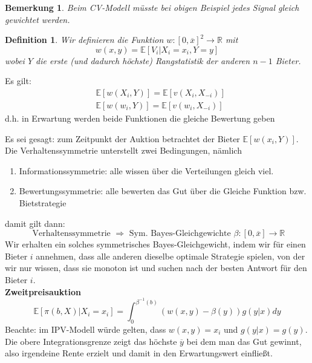 \documentclass[12pt]{extreport} %
\newcommand{\R}{\mathbb{R}}
\theoremstyle{named}
\theoremstyle{nnamed}
\theoremstyle{itshape}
\newtheorem*{definition}{Definition}
\theoremstyle{normal}
\newtheorem*{bemerkung}{Bemerkung}
\begin{document}
\begin{bemerkung}
	Beim CV-Modell müsste bei obigen Beispiel jedes Signal gleich gewichtet werden.	
\end{bemerkung}

\begin{definition}
	Wir definieren die Funktion $w \colon [0, \overline{x}]^{2} \rightarrow \R$ mit
	$$ w(x,y) = \mathds{E}\left[ V_{i} \big| X_{i} = x_{i}, Y = y \right] $$
	wobei $Y$ die erste (und dadurch höchste) Rangstatistik der anderen $n-1$ Bieter.
\end{definition}

Es gilt: 
\begin{eqnarray*}
	& \mathds{E}[w(X_{i}, Y)]  =  \mathds{E}[v(X_{i}, X_{-i})] \\
	& \mathds{E}[w(w_{i}, Y)]  =  \mathds{E}[v(w_{i}, X_{-i})] 
\end{eqnarray*}
d.h. in Erwartung werden beide Funktionen die gleiche Bewertung geben 

Es sei gesagt: zum Zeitpunkt der Auktion betrachtet der Bieter $\mathds{E}\left[ w(x_i, Y) \right]$. ~\\


Die Verhaltenssymmetrie unterstellt zwei Bedingungen, nämlich
\begin{enumerate}
	\item Informationssymmetrie: alle wissen über die Verteilungen gleich viel.
	\item  Bewertungssymmetrie: alle bewerten das Gut über die Gleiche Funktion bzw. Bietstrategie
\end{enumerate}
damit gilt dann:
$$ \text{ Verhaltenssymmetrie } \Rightarrow \text{ Sym. Bayes-Gleichgewichte } \beta \colon [0, \overline{x}] \rightarrow \R $$ 
Wir erhalten ein solches symmetrisches Bayes-Gleichgewicht, indem wir für einen Bieter $i$ annehmen, dass alle anderen dieselbe optimale Strategie spielen, von der wir nur wissen, dass sie monoton ist und suchen nach der besten Antwort für den Bieter $i$. ~\\

\textbf{Zweitpreisauktion} 
\begin{equation*}
	\mathds{E} \left[ \pi (b, X) \big| X_{i} = x_{i} \right] = \int_{0}^{\beta^{-1}(b)} \left( w(x,y) - \beta(y) \right) g\left(y | x \right) dy \tag*{$(*)$}
\end{equation*} 
Beachte: im IPV-Modell würde gelten, dass $w(x,y) = x_{i}$ und $ g\left(y | x \right) =  g\left(y \right)$. Die obere Integrationsgrenze zeigt das höchste $\overline{y}$ bei dem man das Gut gewinnt, also irgendeine Rente erzielt und damit in den Erwartungswert einfließt. ~\\
\end{document}
